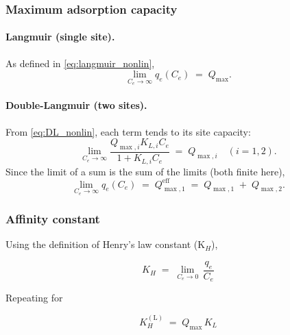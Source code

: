 \documentclass[journal=jacsat,manuscript=article]{achemso}
\begin{document}
\subsubsection{Maximum adsorption capacity}



\paragraph{Langmuir (single site).}
As defined in \cref{eq:langmuir_nonlin},
\begin{equation}
	\lim_{C_e\to\infty} q_e(C_e) \;=\; Q_{\max}.
	\label{eq:L_limit_Ce_max}
\end{equation}

\paragraph{Double-Langmuir (two sites).}
From \cref{eq:DL_nonlin}, each term tends to its site capacity:
\begin{equation}
	\lim_{C_e\to\infty} \frac{Q_{\max,i} K_{L,i} C_e}{1 + K_{L,i} C_e} \;=\; Q_{\max,i}\quad (i=1,2).
	\label{eq:L_limit_Ce_max_sum}
\end{equation}
Since the limit of a sum is the sum of the limits (both finite here),
\begin{equation}
	\lim_{C_e\to\infty} q_e(C_e) \;=\;  Q_{\max,1}^\mathrm{eff} \;=\;  Q_{\max,1} \;+\; Q_{\max,2}.
	\label{eq:L_Ce_max_sum}
\end{equation}

\subsubsection{Affinity constant}



Using the definition of Henry's law constant (K$_H$)\cite{rouquerol_adsorption_2013, al-ghouti_guidelines_2020},

\begin{equation}
	K_H \;=\; \lim_{C_e \to 0}\,\frac{q_e}{C_e}
\end{equation}

Repeating for 

\begin{equation}
	K_H^{(\mathrm{L})} \;=\; Q_{\max}\,K_L
\end{equation}

\end{document}
